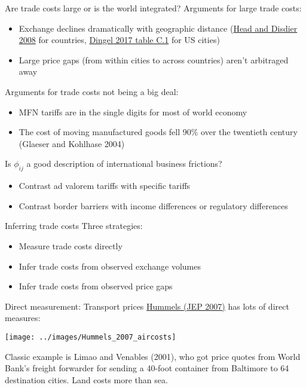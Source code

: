 \documentclass[10pt,notes=hide]{beamer}
\begin{document}
\begin{frame}{Are trade costs large or is the world integrated?}
Arguments for large trade costs:
\begin{itemize}
	\item Exchange declines dramatically with geographic distance ({\small \href{https://www.mitpressjournals.org/doi/10.1162/rest.90.1.37}{Head and Disdier 2008} for countries, \href{http://faculty.chicagobooth.edu/jonathan.dingel/research/thedeterminantsofqualityspecialization.pdf}{Dingel 2017 table C.1} for US cities})
	\item Large price gaps (from within cities to across countries) aren't arbitraged away
\end{itemize}
Arguments for trade costs not being a big deal:
\begin{itemize}
	\item MFN tariffs are in the single digits for most of world economy
	\item The cost of moving manufactured goods fell 90\% over the twentieth century (Glaeser and Kohlhase 2004)
\end{itemize}
Is $\phi_{ij}$ a good description of international business frictions?
\begin{itemize}
	\item Contrast ad valorem tariffs with specific tariffs
	\item Contrast border barriers with income differences or regulatory differences
\end{itemize}
\end{frame}
\begin{frame}{Inferring trade costs}
Three strategies:
\begin{itemize}
	\item Measure trade costs directly
	\item Infer trade costs from observed exchange volumes
	\item Infer trade costs from observed price gaps
\end{itemize}
\end{frame}
\begin{frame}{Direct measurement: Transport prices}
\href{https://www.aeaweb.org/articles?id=10.1257/jep.21.3.131}{Hummels (JEP 2007)} has lots of direct measures:
\begin{center}
\texttt{[image: ../images/Hummels\_2007\_aircosts]}
\end{center}
Classic example is Limao and Venables (2001), who got price quotes from World Bank's freight forwarder for sending a 40-foot container from Baltimore to 64 destination cities.
Land costs more than sea.
\end{frame}
\end{document}
